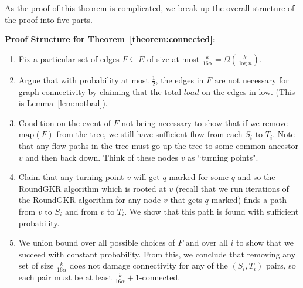 \documentclass[12pt]{article}
\begin{document}
As the proof of this theorem is complicated, we break up the overall structure of the proof into five parts.

\textbf{Proof Structure for Theorem~\ref{theorem:connected}}:
\begin{enumerate}
\item Fix a particular set of edges $F \subseteq E$ of size at most $\frac{k}{16\alpha} = \Omega(\frac{k}{\log n})$. 
\item Argue that with probability at most $\frac{1}{2}$, the edges in $F$ are not necessary for graph connectivity by claiming that the total $load$ on the edges in low. (This is Lemma~\ref{lem:notbad}). 
\item Condition on the event of $F$ not being necessary to show that if we remove $\text{map}(F)$ from the tree, we still have sufficient flow from each $S_i$ to $T_i$. Note that any flow paths in the tree must go up the tree to some common ancestor $v$ and then back down. Think of these nodes $v$ as ``turning points".
\item Claim that any turning point $v$ will get $q$-marked for some $q$ and so the RoundGKR algorithm which is rooted at $v$ (recall that we run iterations of the RoundGKR algorithm for any node $v$ that gets $q$-marked) finds a path from $v$ to $S_i$ and from $v$ to $T_i$. We show that this path is found with sufficient probability.
\item We union bound over all possible choices of $F$ and over all $i$ to show that we succeed with constant probability. From this, we conclude that removing any set of size $\frac{k}{16 \alpha}$ does not damage connectivity for any of the $(S_i,T_i)$ pairs, so each pair must be at least $\frac{k}{16\alpha} + 1$-connected.
\end{enumerate}
\end{document}
